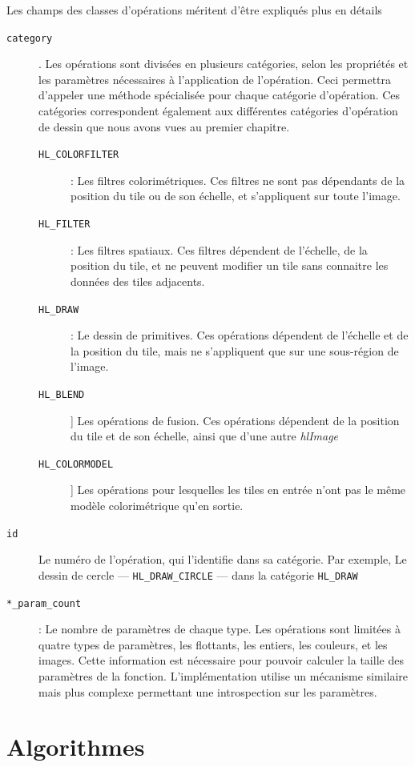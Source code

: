 			Les champs des classes d'opérations méritent d'être expliqués plus en détails	
			\begin{description}
				\item[\texttt{category}]. Les opérations sont divisées en plusieurs catégories, selon les propriétés et les paramètres
				nécessaires à l'application de l'opération. Ceci permettra d'appeler une méthode spécialisée pour chaque catégorie d'opération.
				Ces catégories correspondent également aux différentes catégories d'opération de dessin que nous avons vues au premier chapitre. 
				\begin{description}
					\item[\texttt{HL\_COLORFILTER}]: Les filtres colorimétriques. Ces filtres ne sont pas dépendants de la position du tile ou de son échelle, et s'appliquent
					sur toute l'image. 
					\item[\texttt{HL\_FILTER}]: Les filtres spatiaux. Ces filtres dépendent de l'échelle, de la position du tile, 
					et ne peuvent modifier un tile sans connaitre les données des tiles adjacents.
					\item[\texttt{HL\_DRAW}]: Le dessin de primitives. Ces opérations dépendent de l'échelle et de la position du tile, 
					mais ne s'appliquent que sur une sous-région de l'image.
					\item[\texttt{HL\_BLEND}]] Les opérations de fusion. Ces opérations dépendent de la position du tile et de son échelle, 
					ainsi que d'une autre \emph{hlImage}
					\item[\texttt{HL\_COLORMODEL}]] Les opérations pour lesquelles les tiles en entrée n'ont pas le même modèle colorimétrique
					qu'en sortie. 
				\end{description}
				\item[\texttt{id}]Le numéro de l'opération, qui l'identifie dans sa catégorie. Par exemple, Le dessin de cercle 
				--- \texttt{HL\_DRAW\_CIRCLE} --- dans 
				la catégorie \texttt{HL\_DRAW}
				\item[\texttt{*\_param\_count}]: Le nombre de paramètres de chaque type. Les opérations sont limitées à quatre types de paramètres,
				les flottants, les entiers, les couleurs, et les images. Cette information est nécessaire pour pouvoir calculer la taille des 
				paramètres de la fonction. L'implémentation utilise un mécanisme similaire mais plus complexe permettant une introspection sur les
				paramètres.
			\end{description}
	\section{Algorithmes}
